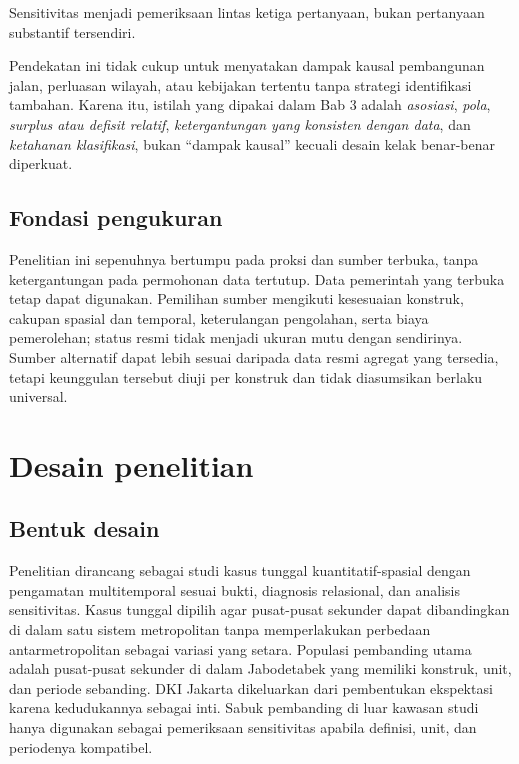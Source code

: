 \documentclass[11pt,a4paper,oneside,openany,indonesian]{report}
\begin{document}
Sensitivitas menjadi pemeriksaan lintas ketiga pertanyaan, bukan
pertanyaan substantif tersendiri.

Pendekatan ini tidak cukup untuk menyatakan dampak kausal pembangunan
jalan, perluasan wilayah, atau kebijakan tertentu tanpa strategi
identifikasi tambahan. Karena itu, istilah yang dipakai dalam Bab 3
adalah \emph{asosiasi}, \emph{pola}, \emph{surplus atau defisit
relatif}, \emph{ketergantungan yang konsisten dengan data}, dan
\emph{ketahanan klasifikasi}, bukan ``dampak kausal'' kecuali desain
kelak benar-benar diperkuat.

\subsection{Fondasi pengukuran}\label{fondasi-pengukuran}

Penelitian ini sepenuhnya bertumpu pada proksi dan sumber terbuka, tanpa
ketergantungan pada permohonan data tertutup. Data pemerintah yang
terbuka tetap dapat digunakan. Pemilihan sumber mengikuti kesesuaian
konstruk, cakupan spasial dan temporal, keterulangan pengolahan, serta
biaya pemerolehan; status resmi tidak menjadi ukuran mutu dengan
sendirinya. Sumber alternatif dapat lebih sesuai daripada data resmi
agregat yang tersedia, tetapi keunggulan tersebut diuji per konstruk dan
tidak diasumsikan berlaku universal.

\section{Desain penelitian}\label{desain-penelitian}

\subsection{Bentuk desain}\label{bentuk-desain}

Penelitian dirancang sebagai studi kasus tunggal kuantitatif-spasial
dengan pengamatan multitemporal sesuai bukti, diagnosis relasional, dan
analisis sensitivitas. Kasus tunggal dipilih agar pusat-pusat sekunder
dapat dibandingkan di dalam satu sistem metropolitan tanpa memperlakukan
perbedaan antarmetropolitan sebagai variasi yang setara. Populasi
pembanding utama adalah pusat-pusat sekunder di dalam Jabodetabek yang
memiliki konstruk, unit, dan periode sebanding. DKI Jakarta dikeluarkan
dari pembentukan ekspektasi karena kedudukannya sebagai inti. Sabuk
pembanding di luar kawasan studi hanya digunakan sebagai pemeriksaan
sensitivitas apabila definisi, unit, dan periodenya kompatibel.
\end{document}
